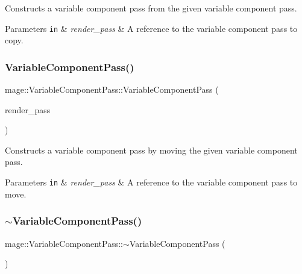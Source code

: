 Constructs a variable component pass from the given variable component pass.


\begin{DoxyParams}[1]{Parameters}
\mbox{\tt in}  & {\em render\+\_\+pass} & A reference to the variable component pass to copy. \\
\hline
\end{DoxyParams}
\hypertarget{classmage_1_1_variable_component_pass_a2721ef623ca91abfac8ae7092094a0fb}{}\label{classmage_1_1_variable_component_pass_a2721ef623ca91abfac8ae7092094a0fb} 
\subsubsection{\texorpdfstring{Variable\+Component\+Pass()}{VariableComponentPass()}\hspace{0.1cm}{\footnotesize\ttfamily [3/3]}}
{\footnotesize\ttfamily mage\+::\+Variable\+Component\+Pass\+::\+Variable\+Component\+Pass (\begin{DoxyParamCaption}\item[{\hyperlink{classmage_1_1_variable_component_pass}{Variable\+Component\+Pass} \&\&}]{render\+\_\+pass }\end{DoxyParamCaption})\hspace{0.3cm}{\ttfamily [default]}}

Constructs a variable component pass by moving the given variable component pass.


\begin{DoxyParams}[1]{Parameters}
\mbox{\tt in}  & {\em render\+\_\+pass} & A reference to the variable component pass to move. \\
\hline
\end{DoxyParams}
\hypertarget{classmage_1_1_variable_component_pass_addf03c307a88e6a1871f0ec3adbb8bcb}{}\label{classmage_1_1_variable_component_pass_addf03c307a88e6a1871f0ec3adbb8bcb} 
\subsubsection{\texorpdfstring{$\sim$\+Variable\+Component\+Pass()}{~VariableComponentPass()}}
{\footnotesize\ttfamily mage\+::\+Variable\+Component\+Pass\+::$\sim$\+Variable\+Component\+Pass (\begin{DoxyParamCaption}{ }\end{DoxyParamCaption})\hspace{0.3cm}{\ttfamily [default]}}

